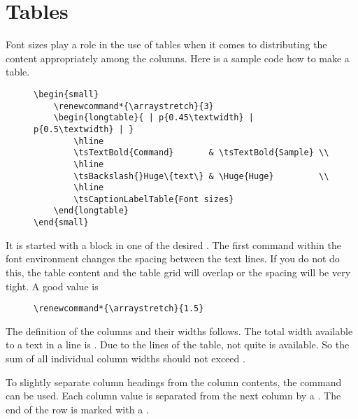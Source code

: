 \section{Tables}

Font sizes play a role in the use of tables when it comes to distributing
the content appropriately among the columns. Here is a sample code how to
make a table.

\begin{figure}[H]
    \small
    \centering
    \begin{BVerbatim}
\begin{small}
    \renewcommand*{\arraystretch}{3}
    \begin{longtable}{ | p{0.45\textwidth} | p{0.5\textwidth} | }
        \hline
        \tsTextBold{Command}       & \tsTextBold{Sample} \\
        \hline
        \tsBackslash{}Huge\{text\} & \Huge{Huge}         \\
        \hline
        \tsCaptionLabelTable{Font sizes}
    \end{longtable}
\end{small}
    \end{BVerbatim}
\end{figure}

It is started with a block in one of the desired .
The first command within the font environment changes the spacing between the
text lines. If you do not do this, the table content and the table grid will
overlap or the spacing will be very tight. A good value is

\begin{figure}[H]
    \small
    \centering
    \begin{BVerbatim}
\renewcommand*{\arraystretch}{1.5}
    \end{BVerbatim}
\end{figure}

The definition of the columns and their widths follows. The total width
available to a text in a line is . Due
to the lines of the table, not quite 
is available. So the sum of all individual column widths should not exceed
.
\bigbreak

To slightly separate column headings from the column contents, the\linebreak
{} command can be used. Each
column value is separated from the next column by a \tsTextMonospace{\&}. The end
of the row is marked with a \tsTextMonospace{\tsBackslash{}\tsBackslash{}}.
\bigbreak

